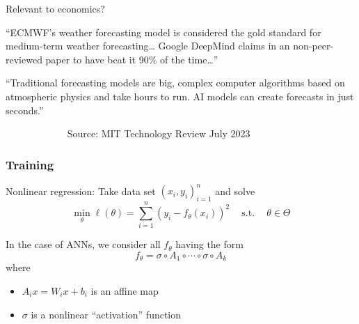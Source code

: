 \documentclass[
    xcolor={svgnames,dvipsnames},
    hyperref={colorlinks, citecolor=DeepPink4, linkcolor=DarkRed, urlcolor=DarkBlue}
    ]{beamer}  %
\newcommand{\st}{\ensuremath{\ \mathrm{s.t.}\ }}
\newcommand{\1}{\mathbbm 1}
\begin{document}
\begin{frame}

    Relevant to economics?

    \vspace{0.5em}
    \vspace{0.5em}
    
    ``ECMWF's weather forecasting model is considered the gold standard for
        medium-term weather forecasting\ldots 
        Google DeepMind claims
        in an non-peer-reviewed paper to have beat it 90\% of the time\ldots''

    \vspace{0.5em}
    \vspace{0.5em}

    ``Traditional forecasting models are big, complex computer algorithms based
    on atmospheric physics and take hours to run. AI models can create forecasts
    in just seconds.'' 
    \vspace{0.5em}
    \vspace{0.5em}

    $\quad \qquad$$\quad \qquad$ Source: MIT Technology Review  July 2023



\end{frame}

\begin{frame}
    \frametitle{Training}

    Nonlinear regression: Take data set $(x_i, y_i)_{i=1}^n$ and solve
    \begin{equation*}
        \min_\theta  \ell(\theta) = \sum_{i=1}^n (y_i - f_\theta(x_i))^2
        \quad \st \quad \theta \in \Theta
    \end{equation*}

    \vspace{0.5em}
    In the case of ANNs, we consider all $f_\theta$ having the form
    \begin{equation*}
        f_\theta
        = \sigma \circ A_{1} \circ \cdots \circ \sigma \circ A_{k} 
    \end{equation*}
    where
    \begin{itemize}
        \item $A_{i} x = W_{i} x + b_{i} $ is an affine map 
        \vspace{0.5em}
        \item $\sigma$ is a nonlinear ``activation'' function
    \end{itemize}

\end{frame}
\end{document}
